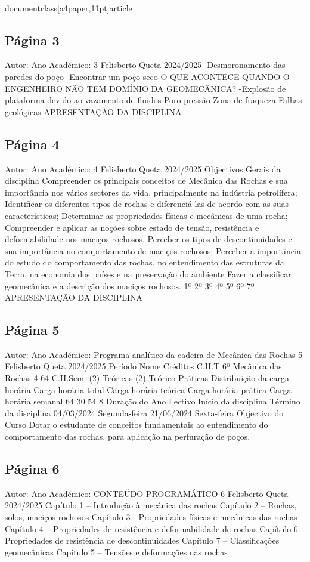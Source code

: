 \\documentclass[a4paper,11pt]{article}
\begin{document}
\subsection*{Página 3}
Autor:
Ano Académico:
3
Felisberto Queta
2024/2025
-Desmoronamento das paredes do poço
-Encontrar um poço seco
O QUE ACONTECE QUANDO O ENGENHEIRO NÃO TEM DOMÍNIO DA GEOMECÂNICA? 
-Explosão de plataforma devido ao 
vazamento de fluidos
Poro-pressâo
Zona de 
fraqueza
Falhas 
geológicas
APRESENTAÇÃO DA DISCIPLINA



\subsection*{Página 4}
Autor:
Ano Académico:
4
Felisberto Queta
2024/2025
Objectivos Gerais da disciplina
Compreender os principais conceitos de Mecânica das Rochas e sua importância nos 
vários sectores da vida, principalmente na indústria petrolífera;
Identificar os diferentes tipos de rochas e diferenciá-las de acordo com as suas 
características;
Determinar as propriedades físicas e mecânicas de uma rocha;
Compreender e aplicar as noções sobre estado de tensão,  resistência e 
deformabilidade nos maciços rochosos. 
Perceber os tipos de descontinuidades e sua importância no comportamento de 
maciços rochosos; 
Perceber a importância do estudo do comportamento das rochas, no entendimento 
das estruturas da Terra, na economia dos países e na preservação do ambiente
Fazer a classificar geomecânica e a descrição dos maciços rochosos.
1º
2º
3º
4º
5º
6º
7º
APRESENTAÇÃO DA DISCIPLINA



\subsection*{Página 5}
Autor:
Ano Académico:
Programa analítico da cadeira de Mecânica das Rochas
5
Felisberto Queta
2024/2025
Período 
Nome
Créditos 
C.H.T 
6º
Mecânica das Rochas
4
64
C.H.Sem. 
(2) Teóricas (2) Teórico-Práticas 
Distribuição da carga horária
Carga horária total 
Carga horária teórica
Carga horária prática 
Carga horária 
semanal 
64
30
54
8
Duração do Ano Lectivo
Início da disciplina
Término da disciplina
04/03/2024 Segunda-feira
21/06/2024 Sexta-feira
Objectivo do Curso
Dotar o estudante de conceitos fundamentais ao entendimento do comportamento das
rochas, para aplicação na perfuração de poços.



\subsection*{Página 6}
Autor:
Ano Académico:
CONTEÚDO PROGRAMÁTICO
6
Felisberto Queta
2024/2025
Capítulo 1 – Introdução à mecânica das rochas 
Capítulo 2 – Rochas, solos, maciços rochosos
Capítulo 3 - Propriedades físicas e mecânicas das rochas 
Capítulo 4 – Propriedades de resistência e deformabilidade de rochas
Capítulo 6 – Propriedades de resistência de descontinuidades
Capítulo 7 – Classificações geomecânicas
Capítulo 5 – Tensões e deformações nas rochas
\end{document}
